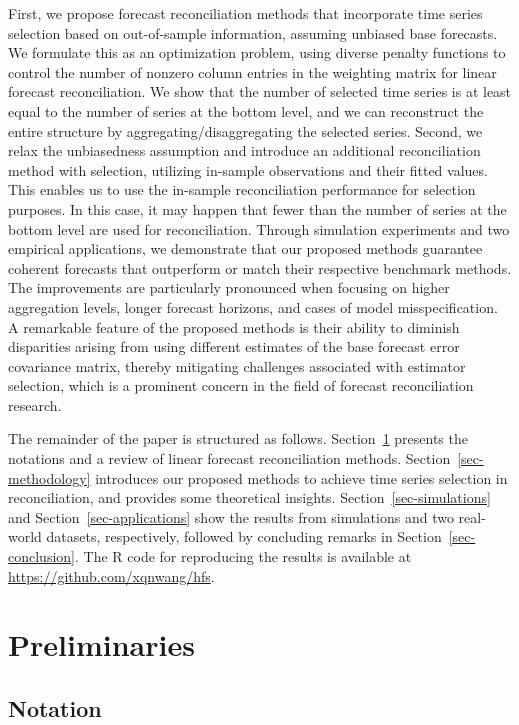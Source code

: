 \documentclass[
  11pt]{article}
\begin{document}
First, we propose forecast reconciliation methods that incorporate time
series selection based on out-of-sample information, assuming unbiased
base forecasts. We formulate this as an optimization problem, using
diverse penalty functions to control the number of nonzero column
entries in the weighting matrix for linear forecast reconciliation. We
show that the number of selected time series is at least equal to the
number of series at the bottom level, and we can reconstruct the entire
structure by aggregating/disaggregating the selected series. Second, we
relax the unbiasedness assumption and introduce an additional
reconciliation method with selection, utilizing in-sample observations
and their fitted values. This enables us to use the in-sample
reconciliation performance for selection purposes. In this case, it may
happen that fewer than the number of series at the bottom level are used
for reconciliation. Through simulation experiments and two empirical
applications, we demonstrate that our proposed methods guarantee
coherent forecasts that outperform or match their respective benchmark
methods. The improvements are particularly pronounced when focusing on
higher aggregation levels, longer forecast horizons, and cases of model
misspecification. A remarkable feature of the proposed methods is their
ability to diminish disparities arising from using different estimates
of the base forecast error covariance matrix, thereby mitigating
challenges associated with estimator selection, which is a prominent
concern in the field of forecast reconciliation research.

The remainder of the paper is structured as follows.
Section~\ref{sec-preliminaries} presents the notations and a review of
linear forecast reconciliation methods. Section~\ref{sec-methodology}
introduces our proposed methods to achieve time series selection in
reconciliation, and provides some theoretical insights.
Section~\ref{sec-simulations} and Section~\ref{sec-applications} show
the results from simulations and two real-world datasets, respectively,
followed by concluding remarks in Section~\ref{sec-conclusion}. The R
code for reproducing the results is available at
\url{https://github.com/xqnwang/hfs}.

\hypertarget{sec-preliminaries}{%
\section{Preliminaries}\label{sec-preliminaries}}

\hypertarget{notation}{%
\subsection{Notation}\label{notation}}
\end{document}
